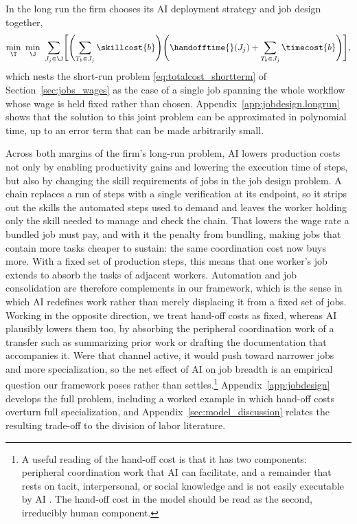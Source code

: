 In the long run the firm chooses its AI deployment strategy and job design together,
\begin{align}
\label{eq:lr_totalcost}
\min_{\T} \ \min_{\J} \
\sum_{J_j \in \J} \Biggl[\Biggl(\sum_{T_b \in J_j} \skillcost{b} \Biggr) \Biggl(\handofftime{}(J_j) + \sum_{T_b \in J_j} \timecost{b} \Biggr)\Biggr],
\end{align}
which nests the short-run problem \eqref{eq:totalcost_shortterm} of Section~\ref{sec:jobs_wages} as the case of a single job spanning the whole workflow whose wage is held fixed rather than chosen.
Appendix~\ref{app:jobdesign.longrun} shows that the solution to this joint problem can be approximated in polynomial time, up to an error term that can be made arbitrarily small.

Across both margins of the firm's long-run problem, AI lowers production costs not only by enabling productivity gains and lowering the execution time of steps, but also by changing the skill requirements of jobs in the job design problem.
A chain replaces a run of steps with a single verification at its endpoint, so it strips out the skills the automated steps used to demand and leaves the worker holding only the skill needed to manage and check the chain.
That lowers the wage rate a bundled job must pay, and with it the penalty from bundling, making jobs that contain more tasks cheaper to sustain: the same coordination cost now buys more.
With a fixed set of production steps, this means that one worker's job extends to absorb the tasks of adjacent workers.
Automation and job consolidation are therefore complements in our framework, which is the sense in which AI redefines work rather than merely displacing it from a fixed set of jobs.
Working in the opposite direction, we treat hand-off costs as fixed, whereas AI plausibly lowers them too, by absorbing the peripheral coordination work of a transfer such as summarizing prior work or drafting the documentation that accompanies it.
Were that channel active, it would push toward narrower jobs and more specialization, so the net effect of AI on job breadth is an empirical question our framework poses rather than settles.\footnote{
A useful reading of the hand-off cost is that it has two components: peripheral coordination work that AI can facilitate, and a remainder that rests on tacit, interpersonal, or social knowledge and is not easily executable by AI \citep{deming2017growing}.
The hand-off cost in the model should be read as the second, irreducibly human component.
}
Appendix~\ref{app:jobdesign} develops the full problem, including a worked example in which hand-off costs overturn full specialization, and Appendix~\ref{sec:model_discussion} relates the resulting trade-off to the division of labor literature.


